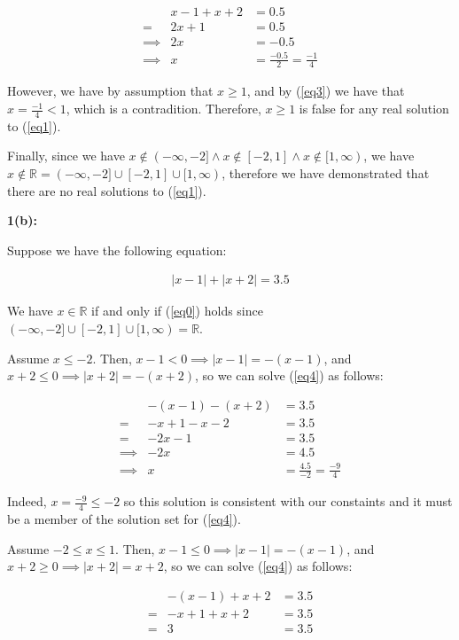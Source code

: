 \documentclass{article}
\newcommand{\reals}{\mathbb{R}}
\begin{document}
\begin{align}
	& x-1 +x+2 & = 0.5 \\
	= & 2x+1 & = 0.5 \\
	\implies & 2x & = -0.5 \\
	\label{eq3} \implies & x & = \frac{-0.5}{2} = \frac{-1}{4}
\end{align}

However, we have by assumption that $x \geq 1$,
and by (\ref{eq3}) we have that $x = \frac{-1}{4} < 1$,
which is a contradition.
Therefore, $x \geq 1$ is false for any real solution to (\ref{eq1}).

Finally, since we have $x \not \in (-\infty,-2] \land x \not\in [-2,1] \land x \not \in [1,\infty)$,
we have $x \not \in \reals = (-\infty,-2] \cup [-2,1] \cup [1,\infty)$,
therefore we have demonstrated that there are no real solutions to (\ref{eq1}).

\medskip
\textbf{1(b):}

Suppose we have the following equation:

\begin{align} \label{eq4}
	|x-1| + |x+2| = 3.5
\end{align}

We have $x \in \reals $ if and only if (\ref{eq0}) holds
since $(-\infty,-2] \cup [-2,1] \cup [1,\infty) = \reals$.

Assume $x \le -2$.
Then, $x-1 < 0 \implies |x-1| = -(x-1)$,
and $x+2 \le 0 \implies |x+2| = -(x+2)$,
so we can solve (\ref{eq4}) as follows:

\begin{align}
	& -(x-1) -(x+2) & = 3.5 \\
	= & -x+1 -x-2 & = 3.5 \\
	= & -2x-1 & = 3.5 \\
	\implies & -2x & = 4.5 \\
	\label{eq5} \implies & x & = \frac{4.5}{-2} = \frac{-9}{4}
\end{align}

Indeed, $x = \frac{-9}{4} \le -2$ so this solution is consistent
with our constaints and it must be a member of the solution set for (\ref{eq4}).

Assume $-2 \le x \le 1$.
Then, $x-1 \le 0 \implies |x-1| = -(x-1)$,
and $x+2 \geq 0 \implies |x+2| = x+2$,
so we can solve (\ref{eq4}) as follows:

\begin{align}
	& -(x-1) + x+2 & = 3.5 \\
	= & -x+1 + x+2 & = 3.5 \\
	= & 3 & = 3.5
\end{align}
\end{document}

